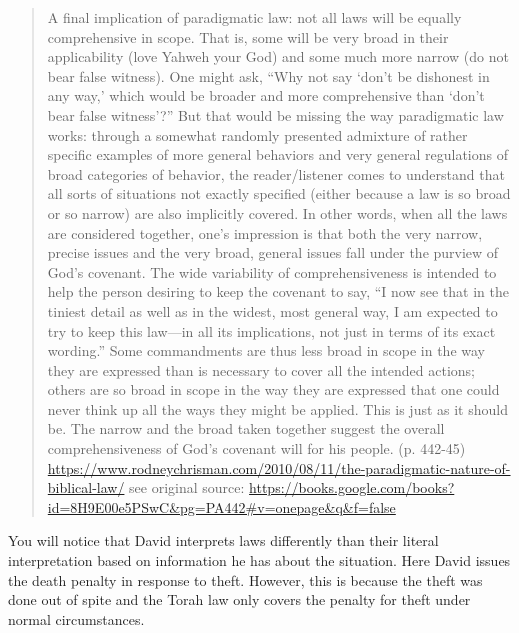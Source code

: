 \documentclass[11pt]{article}
\begin{document}
\begin{quote}
A final implication of paradigmatic law: not all laws will be equally comprehensive in scope.  That is, some will be very broad in their applicability (love Yahweh your God) and some much more narrow (do not bear false witness).  One might ask, “Why not say ‘don’t be dishonest in any way,’ which would be broader and more comprehensive than ‘don’t bear false witness’?”  But that would be missing the way paradigmatic law works: through a somewhat randomly presented admixture of rather specific examples of more general behaviors and very general regulations of broad categories of behavior, the reader/listener comes to understand that all sorts of situations not exactly specified (either because a law is so broad or so narrow) are also implicitly covered.  In other words, when all the laws are considered together, one’s impression is that both the very narrow, precise issues and the very broad, general issues fall under the purview of God’s covenant.  The wide variability of comprehensiveness is intended to help the person desiring to keep the covenant to say, “I now see that in the tiniest detail as well as in the widest, most general way, I am expected to try to keep this law—in all its implications, not just in terms of its exact wording.”  Some commandments are thus less broad in scope in the way they are expressed than is necessary to cover all the intended actions; others are so broad in scope in the way they are expressed that one could never think up all the ways they might be applied.  This is just as it should be.  The narrow and the broad taken together suggest the overall comprehensiveness of God’s covenant will for his people.  (p. 442-45)
\url{https://www.rodneychrisman.com/2010/08/11/the-paradigmatic-nature-of-biblical-law/} see original source: \url{https://books.google.com/books?id=8H9E00e5PSwC&pg=PA442#v=onepage&q&f=false}
\end{quote}

You will notice that David interprets laws differently than their literal interpretation based on information he has about the situation. Here David issues the death penalty in response to theft. However, this is because the theft was done out of spite and the Torah law only covers the penalty for theft under normal circumstances.
\end{document}

